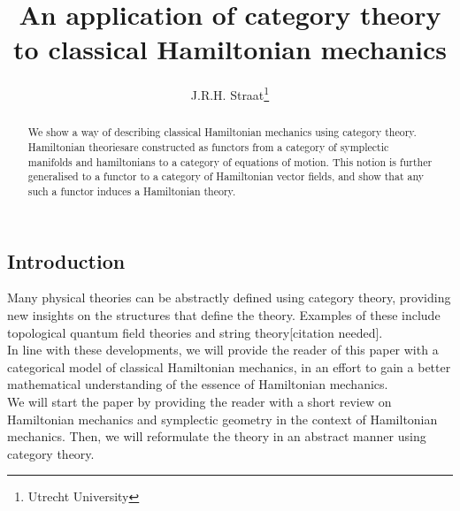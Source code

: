 \documentclass{article}
\title{An application of category theory to classical Hamiltonian mechanics}
\author{J.R.H. Straat\thanks{Utrecht University}}%
\date{}
\begin{document}
\maketitle
%
\begin{abstract}
	We show a way of describing classical Hamiltonian mechanics using category theory. Hamiltonian theoriesare constructed as functors from a category of symplectic manifolds and hamiltonians to a category of equations of motion. This notion is further generalised to a functor to a category of Hamiltonian vector fields, and show that any such a functor induces a Hamiltonian theory.
\end{abstract}
%
\begin{multicols}{2}
	\section{Introduction}
	Many physical theories can be abstractly defined using category theory, providing new insights on the structures that define the theory. Examples of these include topological quantum field theories\cite{BaezTQFT} and string theory[citation needed].\\%
	In line with these developments, we will provide the reader of this paper with a categorical model of classical Hamiltonian mechanics, in an effort to gain a better mathematical understanding of the essence of Hamiltonian mechanics.\\
	We will start the paper by providing the reader with a short review on Hamiltonian mechanics and symplectic geometry in the context of Hamiltonian mechanics. Then, we will reformulate the theory in an abstract manner using category theory.

\end{multicols}
\end{document}
